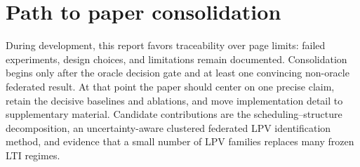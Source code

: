 \section{Path to paper consolidation}
During development, this report favors traceability over page limits: failed
experiments, design choices, and limitations remain documented. Consolidation
begins only after the oracle decision gate and at least one convincing
non-oracle federated result. At that point the paper should center on one precise
claim, retain the decisive baselines and ablations, and move implementation detail
to supplementary material. Candidate contributions are the scheduling--structure
decomposition, an uncertainty-aware clustered federated LPV identification method,
and evidence that a small number of LPV families replaces many frozen LTI regimes.

